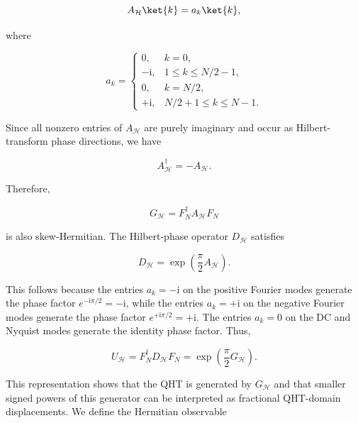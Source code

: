 \documentclass[11pt]{article}
\theoremstyle{plain}
\theoremstyle{definition}
\theoremstyle{remark}
\begin{document}
\begin{equation}
A_{\mathcal H}\ket{k}
=
a_k\ket{k},
\end{equation}

where

\begin{equation}
a_k =
\begin{cases}
0, & k=0,\\
-\mathrm{i}, & 1\leq k\leq N/2-1,\\
0, & k=N/2,\\
+\mathrm{i}, & N/2+1\leq k\leq N-1.
\end{cases}
\label{eq:qht-generator-mask-main}
\end{equation}

Since all nonzero entries of $A_{\mathcal H}$ are purely imaginary and occur as Hilbert-transform phase directions, we have

\begin{equation}
A_{\mathcal H}^{\dagger}
=
-A_{\mathcal H}.
\end{equation}

Therefore,

\begin{equation}
G_{\mathcal H}
=
F_N^\dagger A_{\mathcal H}F_N
\end{equation}

is also skew-Hermitian. The Hilbert-phase operator $D_{\mathcal H}$ satisfies

\begin{equation}
D_{\mathcal H}
=
\exp\left(
\frac{\pi}{2}A_{\mathcal H}
\right).
\end{equation}

This follows because the entries $a_k=-\mathrm{i}$ on the positive Fourier modes generate the phase factor $e^{-\mathrm{i}\pi/2}=-\mathrm{i}$, while the entries $a_k=+\mathrm{i}$ on the negative Fourier modes generate the phase factor $e^{+\mathrm{i}\pi/2}=+\mathrm{i}$. The entries $a_k=0$ on the DC and Nyquist modes generate the identity phase factor. Thus,

\begin{equation}
U_{\mathcal H}
=
F_N^\dagger D_{\mathcal H}F_N
=
\exp\left(
\frac{\pi}{2}G_{\mathcal H}
\right).
\end{equation}

This representation shows that the QHT is generated by $G_{\mathcal H}$ and that smaller signed powers of this generator can be interpreted as fractional QHT-domain displacements. We define the Hermitian observable
\end{document}
